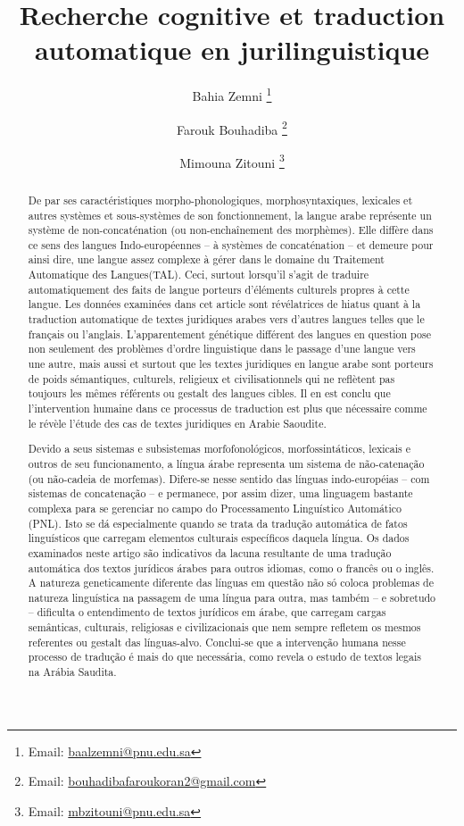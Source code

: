 \documentclass[french]{textolivre}
\title{Recherche cognitive et traduction automatique en jurilinguistique}
\author[1]{Bahia Zemni \orcid{0000-0002-6238-7509} \thanks{Email: \url{baalzemni@pnu.edu.sa}}}
\author[2]{Farouk Bouhadiba \orcid{0000-0002-6767-8073} \thanks{Email: \url{bouhadibafaroukoran2@gmail.com}}}
\author[1]{Mimouna Zitouni \orcid{0000-0002-4167-3602} \thanks{Email: \url{mbzitouni@pnu.edu.sa}}}
\affil[1]{Translation Department, College of Languages, Princess Nourah bint Abdulrahman University, Riyadh, Saudi Arabia.}
\affil[2]{English Department, College of Foreign Languages, University of Oran 2-Mohamed Ben Ahmed, Oran, Algeria.}
\begin{document}
\maketitle

\begin{polyabstract}
\begin{abstract}
De par ses caractéristiques morpho-phonologiques, morphosyntaxiques, lexicales et autres systèmes et sous-systèmes de son fonctionnement, la langue arabe représente un système de non-concaténation (ou non-enchaînement des morphèmes). Elle diffère dans ce sens des langues Indo-européennes – à systèmes de concaténation – et demeure pour ainsi dire, une langue assez complexe à gérer dans le domaine du Traitement Automatique des Langues(TAL). Ceci, surtout lorsqu’il s’agit de traduire automatiquement des faits de langue porteurs d’éléments culturels propres à cette langue. Les données examinées dans cet article sont révélatrices de hiatus quant à la traduction automatique de textes juridiques arabes vers d’autres langues telles que le français ou l’anglais.  L’apparentement génétique différent des langues en question pose non seulement des problèmes d’ordre linguistique dans le passage d’une langue vers une autre, mais aussi et surtout que les textes juridiques en langue arabe sont porteurs de poids sémantiques, culturels, religieux et civilisationnels qui ne reflètent pas toujours les mêmes référents ou gestalt des langues cibles. Il en est conclu que l’intervention humaine dans ce processus de traduction est plus que nécessaire comme le révèle l’étude des cas de textes juridiques en Arabie Saoudite.   

\end{abstract}

\begin{portuguese}
\begin{abstract}
Devido a seus sistemas e subsistemas morfofonológicos, morfossintáticos, lexicais e outros de seu funcionamento, a língua árabe representa um sistema de não-catenação (ou não-cadeia de morfemas). Difere-se nesse sentido das línguas indo-européias – com sistemas de concatenação – e permanece, por assim dizer, uma linguagem bastante complexa para se gerenciar no campo do Processamento Linguístico Automático (PNL). Isto se dá especialmente quando se trata da tradução automática de fatos linguísticos que carregam elementos culturais específicos daquela língua. Os dados examinados neste artigo são indicativos da lacuna resultante de uma tradução automática dos textos jurídicos árabes para outros idiomas, como o francês ou o inglês. A natureza geneticamente diferente das línguas em questão não só coloca problemas de natureza linguística na passagem de uma língua para outra, mas também – e sobretudo – dificulta o entendimento de textos jurídicos em árabe, que carregam cargas semânticas, culturais, religiosas e civilizacionais que nem sempre refletem os mesmos referentes ou gestalt das línguas-alvo. Conclui-se que a intervenção humana nesse processo de tradução é mais do que necessária, como revela o estudo de textos legais na Arábia Saudita.


\end{abstract}
\end{portuguese}
\end{polyabstract}
\end{document}
